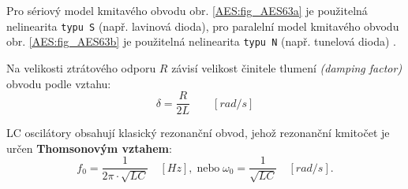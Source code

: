       Pro sériový model kmitavého obvodu obr. \ref{AES:fig_AES63a} je použitelná nelinearita 
      \texttt{typu S} (např. lavinová dioda), pro paralelní model kmitavého obvodu obr. 
      \ref{AES:fig_AES63b} je použitelná nelinearita \texttt{typu N} (např. tunelová dioda) 
      \cite[s.~93]{Koucky1997}.

      \begin{figure}[ht!]
        \centering  
        \caption{ }
        \label{MIT:fig_AES_63}
      \end{figure}
      
      Na velikosti ztrátového odporu \(R\) závisí velikost činitele tlumení \emph{(damping factor)} 
      obvodu podle vztahu:
      \begin{equation}\label{AES:eq_osc01}
        \delta = \frac{R}{2L} \qquad [rad/s]
      \end{equation}
      
      LC oscilátory obsahují klasický rezonanční obvod, jehož rezonanční kmitočet je určen 
      \textbf{Thomsonovým vztahem}:
      \begin{equation}\label{AES:eq_osc03}
        f_0 = \frac{1}{2\pi\cdot\sqrt{LC}} \quad [Hz], \;\text{nebo}\; 
        \omega_0 = \frac{1}{\sqrt{LC}} \quad [rad/s].
      \end{equation}
      
